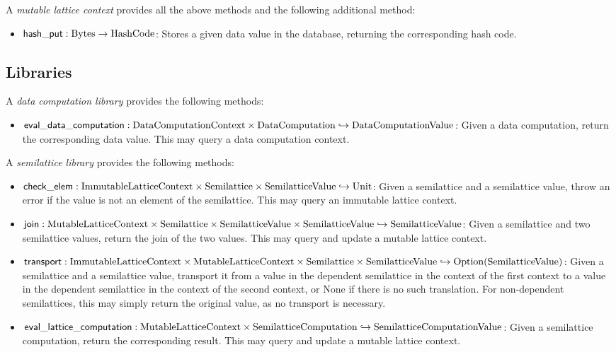 \documentclass{article}
\begin{document}
      A \emph{mutable lattice context} provides all the above methods and the following additional method:


      \begin{itemize}
        \item $\mathsf{hash\_put} : \mathrm{Bytes} \to \mathrm{HashCode}$: Stores a given data value in the database, returning the corresponding hash code.
      \end{itemize}

    \subsection{Libraries}

      A \emph{data computation library} provides the following methods:


      \begin{itemize}
        \item $\mathsf{eval\_data\_computation} : \mathrm{DataComputationContext} \times \mathrm{DataComputation} \hookrightarrow \mathrm{DataComputationValue}$: Given a data computation, return the corresponding data value. This may query a data computation context.
      \end{itemize}

      A \emph{semilattice library} provides the following methods:


      \begin{itemize}
        \item $\mathsf{check\_elem} : \mathrm{ImmutableLatticeContext} \times \mathrm{Semilattice} \times \mathrm{SemilatticeValue} \hookrightarrow \mathrm{Unit}$: Given a semilattice and a semilattice value, throw an error if the value is not an element of the semilattice. This may query an immutable lattice context.
        \item $\mathsf{join} : \mathrm{MutableLatticeContext} \times \mathrm{Semilattice} \times \mathrm{SemilatticeValue} \times \mathrm{SemilatticeValue} \hookrightarrow \mathrm{SemilatticeValue}$: Given a semilattice and two semilattice values, return the join of the two values. This may query and update a mutable lattice context.
        \item $\mathsf{transport} : \mathrm{ImmutableLatticeContext} \times \mathrm{MutableLatticeContext} \times \mathrm{Semilattice} \times \mathrm{SemilatticeValue} \hookrightarrow \mathrm{Option}(\mathrm{SemilatticeValue})$: Given a semilattice and a semilattice value, transport it from a value in the dependent semilattice in the context of the first context to a value in the dependent semilattice in the context of the second context, or $\mathrm{None}$ if there is no such translation. For non-dependent semilattices, this may simply return the original value, as no transport is necessary.
        \item $\mathsf{eval\_lattice\_computation} : \mathrm{MutableLatticeContext} \times \mathrm{SemilatticeComputation} \hookrightarrow \mathrm{SemilatticeComputationValue}$: Given a semilattice computation, return the corresponding result. This may query and update a mutable lattice context.
      \end{itemize}
  
\end{document}
